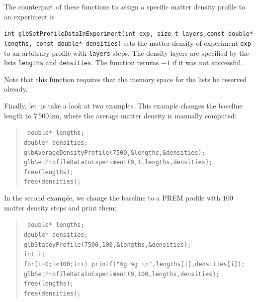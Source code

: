The counterpart of these functions to assign a specific matter density
profile to an experiment is
\begin{function}
{\tt int glbSetProfileDataInExperiment(int exp, size\_t layers,const double* lengths, const double* densities)} sets the matter density of experiment
{\tt exp} to an arbitrary profile with {\tt layers} steps. The density
layers are specified by the lists {\tt lengths} and {\tt densities}.
The function returns $-1$ if it was not successful.
\end{function}
Note that this function requires that the memory space for the lists
be reserved already.

Finally, let us take a look at two examples. This example changes
the baseline length to $7\,500 \, \mathrm{km}$, where the average 
matter density is manually computed:
\begin{quote}
{\tt  
  double* lengths; \\
  double* densities; \\
  glbAverageDensityProfile(7500,\&lengths,\&densities); \\
  glbSetProfileDataInExperiment(0,1,lengths,densities); \\
  free(lengths); \\
  free(densities); \\
}
\end{quote}
In the second example, we change the baseline to a PREM profile with
$100$ matter density steps and print them:
\begin{quote}
{\tt
  double* lengths; \\
  double* densities; \\
  glbStaceyProfile(7500,100,\&lengths,\&densities); \\
  int i; \\
  for(i=0;i<100;i++) printf("\%g \%g $\backslash$n",lengths[i],densities[i]); \\
  glbSetProfileDataInExperiment(0,100,lengths,densities); \\
  free(lengths);\\
  free(densities);\\
}
\end{quote}

